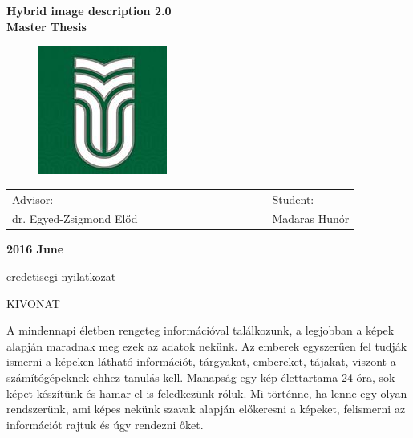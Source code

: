 \documentclass[12pt, a4paper, oneside]{book}
\theoremstyle{tetel}
\begin{document}
\begin{center}
    \vspace{3cm}\LARGE \textbf{Hybrid image description 2.0}\\
    \vspace{1cm}\LARGE \textbf{Master Thesis}\\
\end{center}

\vspace{2cm}
\begin{figure}[htb]
\hspace{5.7cm}\includegraphics[bb = 0 0 160 160]{sapi.jpg}
\end{figure}

\vspace{2cm}
\begin{center}
\begin{tabular}{lcccccccccccl}
     Advisor: & & &&&& &&&&&& Student:\\
     dr. Egyed-Zsigmond Előd &&&&&& &&&&&& Madaras Hunór\\
\end{tabular}
\end{center}

\begin{center}
    \vspace{1cm}\textbf{2016 June}
\end{center}

\newpage
\thispagestyle{empty}
eredetisegi nyilatkozat
\newpage
\thispagestyle{empty}
\begin{center}
    \Large KIVONAT
\end{center}

	 A mindennapi életben rengeteg információval találkozunk, a legjobban a képek alapján maradnak meg ezek az adatok nekünk. Az emberek egyszerűen fel tudják ismerni a képeken látható információt, tárgyakat, embereket, tájakat, viszont a számítógépeknek ehhez tanulás kell. Manapság egy kép élettartama 24 óra, sok képet készítünk és hamar el is feledkezünk róluk. Mi történne, ha lenne egy olyan rendszerünk, ami képes nekünk szavak alapján előkeresni a képeket, felismerni az információt rajtuk és úgy rendezni őket.
\end{document}
